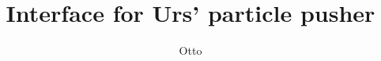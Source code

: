 \documentclass[a4paper,10pt]{article}
\title{Interface for Urs' particle pusher}
\author{Otto}
\begin{document}
\maketitle

\section{}
\end{document}
